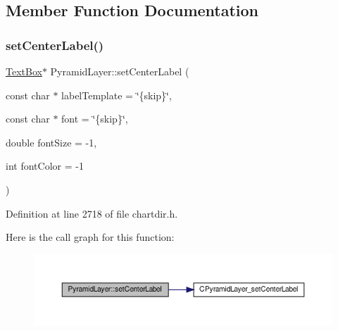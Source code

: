 \subsection{Member Function Documentation}
\mbox{\label{class_pyramid_layer_a070a63da35f3b3fb71a06223c2ddb144}} 
\subsubsection{\texorpdfstring{set\+Center\+Label()}{setCenterLabel()}}
{\footnotesize\ttfamily \hyperlink{class_text_box}{Text\+Box}$\ast$ Pyramid\+Layer\+::set\+Center\+Label (\begin{DoxyParamCaption}\item[{const char $\ast$}]{label\+Template = {\ttfamily \char`\"{}\{skip\}\char`\"{}},  }\item[{const char $\ast$}]{font = {\ttfamily \char`\"{}\{skip\}\char`\"{}},  }\item[{double}]{font\+Size = {\ttfamily -\/1},  }\item[{int}]{font\+Color = {\ttfamily -\/1} }\end{DoxyParamCaption})\hspace{0.3cm}{\ttfamily [inline]}}



Definition at line 2718 of file chartdir.\+h.

Here is the call graph for this function\+:
\nopagebreak
\begin{figure}[H]
\begin{center}
\leavevmode
\includegraphics[width=350pt]{class_pyramid_layer_a070a63da35f3b3fb71a06223c2ddb144_cgraph}
\end{center}
\end{figure}
\mbox{\label{class_pyramid_layer_a01e46a444b4b81a0753aa6068e88e94d}} 

